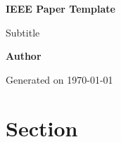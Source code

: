 \documentclass[10pt,conference,compsoc]{IEEEtran}
\begin{document}
\begin{titlepage}
  \begin{center}
    \vspace*{1cm}

    \Huge
    \textbf{IEEE Paper Template}

    \vspace{0.5cm}
    \LARGE
    Subtitle

    \vspace{1.5cm}

    \textbf{Author}

    \vspace{1.5cm}
    \normalsize
    Generated on \monthdayyeardate\today

    \vfill

    \vspace{0.8cm}

  \end{center}

  \vfill

  \vspace{0.8cm}
\end{titlepage}
\thispagestyle{empty}  %

\renewcommand\contentsname{Table of Contents}
\tableofcontents
\listoffigures
\listoftables
\listofsnippets
\thispagestyle{empty}  %
\clearpage


\section{Section}
\end{document}
